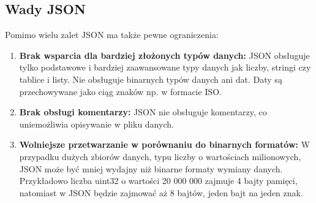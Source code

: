 \subsection{Wady JSON}
Pomimo wielu zalet JSON ma także pewne ograniczenia:
\begin{enumerate}
    \item \textbf{Brak wsparcia dla bardziej złożonych typów danych:}  
    JSON obsługuje tylko podstawowe i bardziej zaawansowane typy danych jak liczby, stringi czy tablice i listy. Nie obsługuje binarnych typów danych ani dat. Daty są przechowywane jako ciąg znaków np. w formacie ISO.
    \item \textbf{Brak obsługi komentarzy:}  
    JSON nie obsługuje komentarzy, co uniemożliwia opisywanie w pliku danych.
    \item \textbf{Wolniejsze przetwarzanie w porównaniu do binarnych formatów:}  
    W przypadku dużych zbiorów danych, typu liczby o wartościach milionowych, JSON może być mniej wydajny niż binarne formaty wymiany danych. Przykładowo liczba uint32 o wartości 20 000 000 zajmuje 4 bajty pamięci, natomiast w JSON będzie zajmować aż 8 bajtów, jeden bajt na jeden znak.
\end{enumerate}
